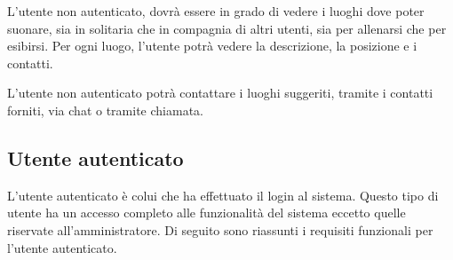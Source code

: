 \documentclass[12pt, a4paper]{article}
\begin{document}
L'utente non autenticato, dovrà essere in grado di vedere i luoghi dove poter suonare, sia in solitaria che in compagnia di altri utenti, sia per allenarsi che per esibirsi. Per ogni luogo, l'utente potrà vedere la descrizione, la posizione e i contatti.

L'utente non autenticato potrà contattare i luoghi suggeriti, tramite i contatti forniti, via chat o tramite chiamata.

\newpage
\subsection{Utente autenticato}

L'utente autenticato è colui che ha effettuato il login al sistema. Questo tipo di utente ha un accesso completo alle funzionalità del sistema eccetto quelle riservate all'amministratore. Di seguito sono riassunti i requisiti funzionali per l'utente autenticato.
\end{document}
